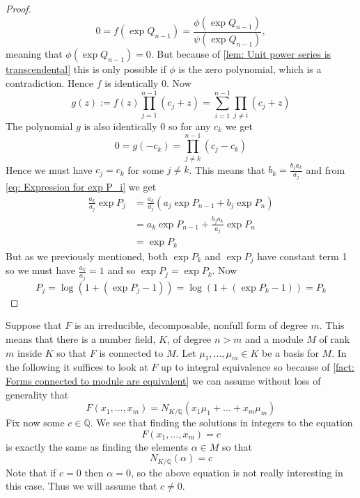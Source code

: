 \documentclass{article}
\DeclareMathOperator{\Gal}{Gal}
\newcommand{\mbb}[1]{\mathbb{#1}}
\begin{document}
\begin{proof}
    $$0 = f(\exp Q_{n-1}) = \frac{\phi(\exp Q_{n-1})}{\psi(\exp Q_{n-1})},$$
    meaning that $\phi(\exp Q_{n-1}) = 0$. But because of \cref{lem: Unit power series is transcendental} this is only possible if $\phi$ is the zero polynomial, which is a contradiction. Hence $f$ is identically 0. Now
    $$g(z) := f(z) \prod_{j=1}^{n-1}(c_j + z)  = \sum_{i = 1}^{n-1}\prod_{j \neq i}(c_j + z)$$
    The polynomial $g$ is also identically 0 so for any $c_k$ we get $$0 = g(-c_k) = \prod_{j \neq k}^{n-1} (c_j - c_k)$$
    Hence we must have $c_j = c_k$ for some $j \neq k$. This means that $b_k = \frac{b_j a_k}{a_j}$ and from \cref{eq: Expression for exp P_i} we get 
    \begin{align*}
        \frac{a_k}{a_j}\exp P_j &= \frac{a_k}{a_j}(a_j \exp P_{n-1} + b_j \exp P_n) \\
        &= a_k \exp P_{n-1} + \frac{b_j a_k}{a_j} \exp P_n \\ 
        &= \exp P_k
    \end{align*}
    But as we previously mentioned, both $\exp P_k$ and $\exp P_j$ have constant term 1 so we must have $\frac{a_k}{a_j} = 1$ and so $\exp P_j = \exp P_k$. Now 
    $$P_j = \log(1 + (\exp P_j - 1)) = \log(1 + (\exp P_k - 1)) = P_k$$
\end{proof}

Suppose that $F$ is an irreducible, decomposable, nonfull form of degree $m$. This means that there is a number field, $K$, of degree $n > m$ and a module $M$ of rank $m$ inside $K$ so that $F$ is connected to $M$. Let $\mu_1, ..., \mu_m \in K$ be a basis for $M$. In the following it suffices to look at $F$ up to integral equivalence so because of \cref{fact: Forms connected to module are equivalent} we can assume without loss of generality that
\begin{equation*}
    F(x_1, ..., x_m) = N_{K / \mbb Q}(x_1 \mu_1 + ... + x_m \mu_m)
\end{equation*}
Fix now some $c \in \mbb Q$. We see that finding the solutions in integers to the equation
\begin{equation}\label{eq: Initial equation of interest}
    F(x_1, ..., x_m) = c
\end{equation}
is exactly the same as finding the elements $\alpha \in M$ so that
\begin{equation}
    N_{K / \mbb Q}(\alpha) = c
\end{equation}
Note that if $c = 0$ then $\alpha = 0$, so the above equation is not really interesting in this case. Thus we will assume that $c \neq 0$.
\end{document}
